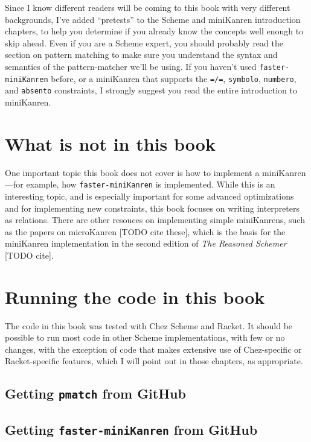 \documentclass{book}
\begin{document}
Since I know different readers will be coming to this book with very different backgrounds, I've added ``pretests'' to the Scheme and miniKanren introduction chapters, to help you determine if you already know the concepts well enough to skip ahead.  Even if you are a Scheme expert, you should probably read the section on pattern matching to make sure you understand the syntax and semantics of the pattern-matcher we'll be using.  If you haven't used \texttt{faster-miniKanren} before, or a miniKanren that supports the \verb|=/=|, \verb|symbolo|, \verb|numbero|, and \verb|absento| constraints, I strongly suggest you read the entire introduction to miniKanren.

\section{What is not in this book}

One important topic this book does not cover is how to implement a miniKanren---for example, how \texttt{faster-miniKanren} is implemented.  While this is an interesting topic, and is especially important for some advanced optimizations and for implementing new constraints, this book focuses on writing interpreters as relations.  There are other resouces on implementing simple miniKanrens, such as the papers on microKanren [TODO cite these], which is the basis for the miniKanren implementation in the second edition of \emph{The Reasoned Schemer} [TODO cite].

\section{Running the code in this book}

The code in this book was tested with Chez Scheme and Racket.  It should be possible to run most code in other Scheme implementations, with few or no changes, with the exception of code that makes extensive use of Chez-specific or Racket-specific features, which I will point out in those chapters, as appropriate.

\subsection{Getting \texttt{pmatch} from GitHub}

\subsection{Getting \texttt{faster-miniKanren} from GitHub}
\end{document}

